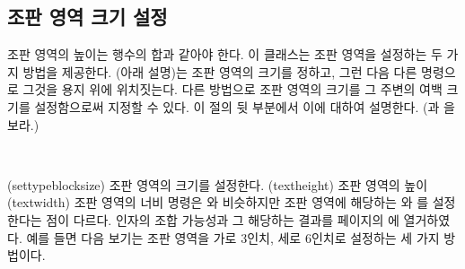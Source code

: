 \subsection{조판 영역 크기 설정}
\label{sec:spec-typebl-size}




조판 영역의 높이는 행수의 합과 같아야 한다. 이 클래스는 
조판 영역을 설정하는 두 가지 방법을 제공한다.
\cmd{\settypeblocksize} (아래 설명)는 조판 영역의 크기를 정하고,
그런 다음 다른 명령으로 그것을 용지 위에 위치짓는다.
다른 방법으로 조판 영역의 크기를 그 주변의 여백 크기를 설정함으로써
지정할 수 있다. 이 절의 뒷 부분에서 이에 대하여 설명한다. (\cmd{\setlrmarginsandblock}과 \cmd{\setulmarginsandblock}을 보라.)

\begin{syntax}
\cmd{\settypeblocksize} \\
\end{syntax}
\glossary(settypeblocksize)%
  {}%
  {조판 영역의 크기를 설정한다.}
\glossary(textheight)%
  {}%
  {조판 영역의 높이}
\glossary(textwidth)%
  {}%
  {조판 영역의 너비}
\cmd{\settypeblocksize} 명령은 \cmd{\settrimmedsize}와 비슷하지만
조판 영역에 해당하는 \lnc{\textheight}와 \lnc{\textwidth}를 설정한다는
점이 다르다.
인자의 조합 가능성과 그 해당하는 결과를 \pageref{rectsize} 페이지의 에 열거하였다.
예를 들면 다음 보기는 조판 영역을 가로 3인치, 세로 6인치로 설정하는
세 가지 방법이다.
\begin{lcode}
\settypeblocksize{6in}{3in}{*}
\end{lcode}

